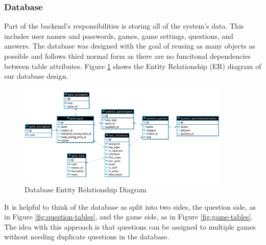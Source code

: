 \documentclass{article}
\begin{document}
		\subsubsection{Database}\label{database}
    		Part of the backend's responsibilities is storing all of the system's data. This includes user names and passwords, games, game settings, questions, and answers. The database was designed with the goal of reusing as many objects as possible and follows third normal form as there are no funcitonal dependencies between table attributes. Figure \ref{fig:database-er_diagram} shows the Entity Relationship (ER) diagram of our database design.
    		
            \begin{figure}[ht]
                \centering
                \includegraphics[width=0.9\textwidth]{images/database-er_diagram.png}
                \caption{Database Entity Relationship Diagram}
                \label{fig:database-er_diagram}
            \end{figure}
            
            It is helpful to think of the database as split into two sides, the question side, as in Figure \ref{fig:question-tables}, and the game side, as in Figure \ref{fig:game-tables}. The idea with this approach is that questions can be assigned to multiple games without needing duplicate questions in the database.
            
\end{document}
